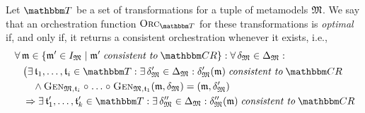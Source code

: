 \begin{definition}
    Let $\transformationset{T}$ be a set of transformations for a tuple of metamodels $\metamodeltuple{M}%
    $.
    We say that an orchestration function $\orcfunction{\transformationset{T}}$ for these transformations is \emph{optimal} if, and only if, it returns a consistent orchestration whenever it exists, i.e.,
    \begin{align*}
        &
        \forall \modeltuple{m} \in \setted{\modeltuple{m}' \in \metamodeltupleinstanceset{M} \mid \modeltuple{m}' \consistenttomath \consistencyrelationset{CR}} : \forall \changetuple{\metamodeltuple{M}} %
        \in \changeuniverse{\metamodeltuple{M}} : \\
        & \formulaskip
            \bigl(
            \exists \transformation{t}_{1}, \dots, \transformation{t}_{i} \in \transformationset{T} : 
            \exists \changetuple{\metamodeltuple{M}}' %
            \in \changeuniverse{\metamodeltuple{M}} : \changetuple{\metamodeltuple{M}}'(\modeltuple{m})
            \consistenttomath \consistencyrelationset{CR}\\
            & \formulaskip \formulaskip
            \land \generalizationfunction{\metamodeltuple{M}, \transformation{t}_{i}} \concatfunction \dots \concatfunction \generalizationfunction{\metamodeltuple{M}, \transformation{t}_{1}}(\modeltuple{m}, \changetuple{\metamodeltuple{M}}) = (\modeltuple{m}, \changetuple{\metamodeltuple{M}}')
            \\
            & \formulaskip
            \Rightarrow
            \exists \transformation{t}_{1}', \dots, \transformation{t}_{k}' \in \transformationset{T} : 
            \exists \changetuple{\metamodeltuple{M}}'' %
            \in \changeuniverse{\metamodeltuple{M}} : \changetuple{\metamodeltuple{M}}''(\modeltuple{m}) \consistenttomath \consistencyrelationset{CR}\\

\end{align*}
\end{definition}

